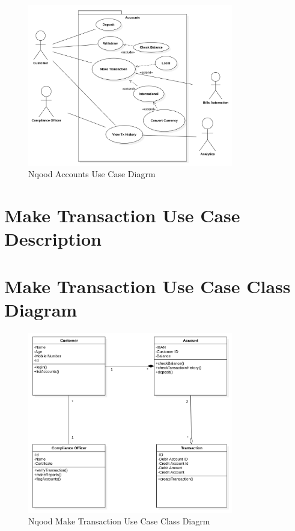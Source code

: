 \documentclass[a4paper]{report}
\begin{document}
\begin{figure}[h!]
    \centering
    \includegraphics[width=0.8\textwidth]{images/nqood-accounts-use-case-diagram.png}
    \caption{Nqood Accounts Use Case Diagrm}
    \label{fig:nqood-accounts-use-case-diagram}
\end{figure}

\section{Make Transaction Use Case Description}



\section{Make Transaction Use Case Class Diagram}

\begin{figure}[h!]
    \centering
    \includegraphics[width=0.8\textwidth]{images/nqood-make-tx-use-case-class-diagram.png}
    \caption{Nqood Make Transaction Use Case Class Diagrm}
    \label{fig:nqood-make-transaction-use-case-class-diagram}
\end{figure}
\end{document}
